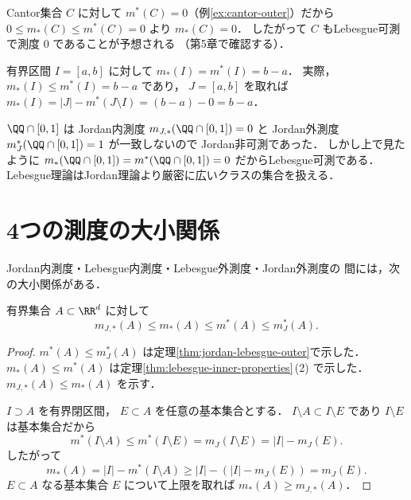 \begin{example}[Cantor集合の内測度]\label{ex:cantor-inner}
Cantor集合 $C$ に対して
$m^*(C) = 0$（例\ref{ex:cantor-outer}）だから
$0 \le m_*(C) \le m^*(C) = 0$
より $m_*(C) = 0$．
したがって $C$ もLebesgue可測で測度 $0$ であることが予想される
（第5章で確認する）．
\end{example}

\begin{example}[区間の内測度]\label{ex:interval-inner}
有界区間 $I = [a,b]$ に対して
$m_*(I) = m^*(I) = b - a$．
実際，$m_*(I) \le m^*(I) = b-a$ であり，
$J = [a,b]$ を取れば
$m_*(I) = |J| - m^*(J \setminus I) = (b-a) - 0 = b-a$．
\end{example}

\begin{example}[Jordan非可測だがLebesgue可測な集合]\label{ex:jordan-no-lebesgue-yes}
$\QQ \cap [0,1]$ は
Jordan内測度 $m_{J,*}(\QQ \cap [0,1]) = 0$ と
Jordan外測度 $m_J^*(\QQ \cap [0,1]) = 1$ が一致しないので
Jordan非可測であった．
しかし上で見たように
$m_*(\QQ \cap [0,1]) = m^*(\QQ \cap [0,1]) = 0$
だからLebesgue可測である．
Lebesgue理論はJordan理論より厳密に広いクラスの集合を扱える．
\end{example}

\section{4つの測度の大小関係}\label{sec:four-measures}

Jordan内測度・Lebesgue内測度・Lebesgue外測度・Jordan外測度の
間には，次の大小関係がある．

\begin{theorem}[4つの測度の大小関係]\label{thm:four-measures}
有界集合 $A \subset \RR^d$ に対して
\[
m_{J,*}(A) \le m_*(A) \le m^*(A) \le m_J^*(A).
\]
\end{theorem}
\begin{proof}
$m^*(A) \le m_J^*(A)$ は定理\ref{thm:jordan-lebesgue-outer}で示した．
$m_*(A) \le m^*(A)$ は定理\ref{thm:lebesgue-inner-properties}\,(2) で示した．
$m_{J,*}(A) \le m_*(A)$ を示す．

$I \supset A$ を有界閉区間，
$E \subset A$ を任意の基本集合とする．
$I \setminus A \subset I \setminus E$ であり
$I \setminus E$ は基本集合だから
\[
m^*(I \setminus A)
\le m^*(I \setminus E)
= m_J(I \setminus E)
= |I| - m_J(E).
\]
したがって
\[
m_*(A) = |I| - m^*(I \setminus A)
\ge |I| - (|I| - m_J(E))
= m_J(E).
\]
$E \subset A$ なる基本集合 $E$ について上限を取れば
$m_*(A) \ge m_{J,*}(A)$．
\end{proof}


